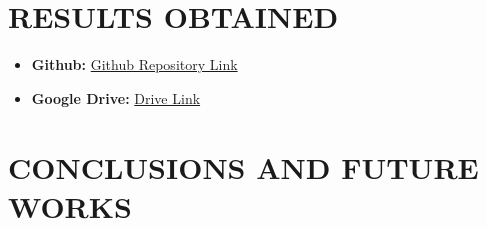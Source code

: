 \documentclass{article}
\begin{document}

\section{RESULTS OBTAINED}
\begin{itemize}
    \item \textbf{Github: }\href{https://github.com/nihar1805/SOEN-6461-Project}{Github Repository Link}
    \item \textbf{Google Drive: }\href{https://drive.google.com/drive/folders/1vo4CgwjhUtiiPU7cmO34Ip_6ecx-gh1F?usp=share_link}{Drive Link}
\end{itemize}

\section{CONCLUSIONS AND FUTURE WORKS}
\end{document}
